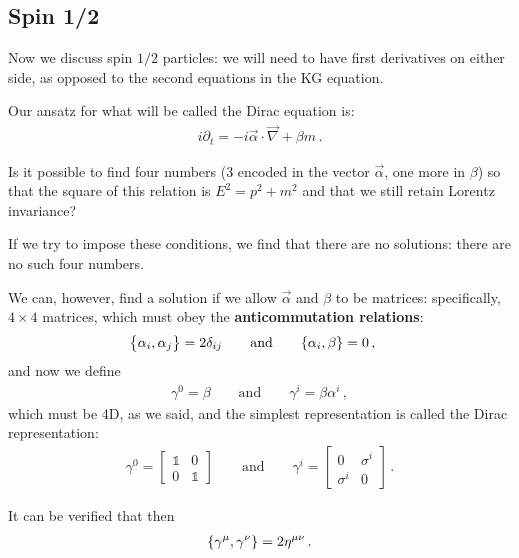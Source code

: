 \documentclass[main.tex]{subfiles}
\begin{document}
\subsection{Spin 1/2}

Now we discuss spin \(1/2\) particles: we will need to have first derivatives on either side, as opposed to the second equations in the KG equation.

Our ansatz for what will be called the Dirac equation is: 
%
\begin{align}
i \partial_{t} = - i \vec{\alpha} \cdot \vec{\nabla} + \beta m
\,.
\end{align}

Is it possible to find four numbers (3 encoded in the vector \(\vec{\alpha} \), one more in \(\beta \)) so that the square of this relation is \(E^2 = p^2+m^2\) and that we still retain Lorentz invariance? 

If we try to impose these conditions, we find that there are no solutions: there are no such four numbers. 

We can, however, find a solution if we allow \(\vec{\alpha}\) and \(\beta \) to be matrices: specifically, \(4 \times 4 \) matrices, which must obey the \textbf{anticommutation relations}: 
%
\begin{align}
\qty{\alpha_{i}, \alpha_{j}} &= 2\delta_{ij} 
\qquad \text{and} \qquad
\qty{\alpha_{i}, \beta } = 0
\,,
\end{align}
%
and now we define 
%
\begin{align}
\gamma^{0} = \beta 
\qquad \text{and} \qquad
\gamma^{i} = \beta \alpha^{i}
\,,
\end{align}
%
which must be 4D, as we said, and the simplest representation is called the Dirac representation:
%
\begin{align}
\gamma^{0} = \left[\begin{array}{cc}
\mathbb{1} & 0 \\ 
0 & \mathbb{1}
\end{array}\right] 
\qquad \text{and} \qquad
\gamma^{i} = \left[\begin{array}{cc}
0 & \sigma^{i}   \\ 
\sigma^{i} & 0
\end{array}\right]
\,.
\end{align}

It can be verified that then 
%
\begin{align}
\qty{\gamma^{\mu }, \gamma^{\nu }} = 2 \eta^{\mu \nu }
\,.
\end{align}
\end{document}
